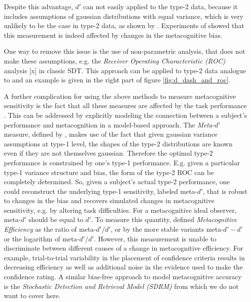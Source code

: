 \documentclass[../main/main.tex]{subfiles}
\begin{document}
	\noindent Despite this advantage, $d'$ can not easily applied to the type-2 data, because it includes assumptions of gaussian distributions with equal variance, which is very unlikely to be the case in type-2 data, as shown by \citep{galvin2003type}. Experiments of \citep{azzopardi2007evaluation} showed that this measurement is indeed affected by changes in the metacognitive bias.
	
	One way to remove this issue is the use of non-parametric analysis, that does not make these assumptions, e.g. the \textit{Receiver Operating Characteristic (ROC)} analysis [x] in classic SDT. This approach can be applied to type-2 data analogue to \citep{clarke1959two} and an example is given in the right part of figure \ref{fig:d_dash_and_roc}.
	
	A further complication for using the above methods to measure metacognitive sensitivity is the fact that all these measures are affected by the task performance \citep{galvin2003type}. This can be addressed by explicitly modeling the connection between a subject's performance and metacognition in a model-based approach. The \textit{Meta-$d'$} measure, defined by \citep{maniscalco2012signal}, makes use of the fact that given gaussian variance assumptions at type-1 level, the shapes of the type-2 distributions are known even if they are not themselves gaussian. Therefore the optimal type-2 performance is constrained by one's type-1 performance. E.g. given a particular type-1 variance structure and bias, the form of the type-2 ROC can be completely determined. So, given a subject's actual type-2 performance, one could reconstruct the underlying type-1 sensitivity, labeled meta-$d'$, that is robust to changes in the bias and recovers simulated changes in metacognitive sensitivity, e.g. by altering task difficulties. For a metacognitive ideal observer, meta-$d'$ should be equal to $d'$. To measure this quantity, \citep{fleming2014measure} defined \textit{Metacognitive Efficiency} as the ratio of meta-$d'/d'$, or by the more stable variants meta-$d'-d'$ or the logarithm of meta-$d'/d'$. However, this measurement is unable to discriminate between different causes of a change in metacognitive efficiency. For example,  trial-to-trial variability in the placement of confidence criteria results in decreasing efficiency as well as additional noise in the evidence used to make the confidence rating. A similar bias-free approach to model metacognitive accuracy is the \textit{Stochastic Detection and Retrieval Model (SDRM)} from \citep{jang2012stochastic} which we do not want to cover here.
	
\end{document}
